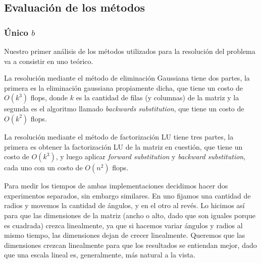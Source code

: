 \subsection{Evaluación de los métodos}

\subsubsection{Único $b$}
Nuestro primer análisis de los métodos utilizados para la resolución del problema va a consistir en uno teórico. 

La resolución mediante el método de eliminación Gaussiana tiene dos partes, la primera es la eliminación gaussiana propiamente dicha, que tiene un costo de $O(k^3)$ flops, donde $k$ es la cantidad de filas (y columnas) de la matriz y la segunda es el algoritmo llamado \emph{backwards substitution}, que tiene un costo de $O(k^2)$ flops.

La resolución mediante el método de factorización LU tiene tres partes, la primera es obtener la factorización LU de la matriz en cuestión, que tiene un costo de $O(k^3)$, y luego aplicar \emph{forward substitution} y \emph{backward substitution}, cada uno con un costo de $O(n^2)$ flops.



Para medir los tiempos de ambas implementaciones decidimos hacer dos experimentos separados, sin embargo similares. 
En uno fijamos una cantidad de radios y movemos la cantidad de ángulos, y en el otro al revés.
Lo hicimos así para que las dimensiones de la matriz (ancho o alto, dado que son iguales porque es cuadrada) crezca linealmente, ya que si hacemos variar ángulos y radios al mismo tiempo, las dimensiones dejan de crecer linealmente.
Queremos que las dimensiones crezcan linealmente para que los resultados se entiendan mejor, dado que una escala lineal es, generalmente, más natural a la vista.


